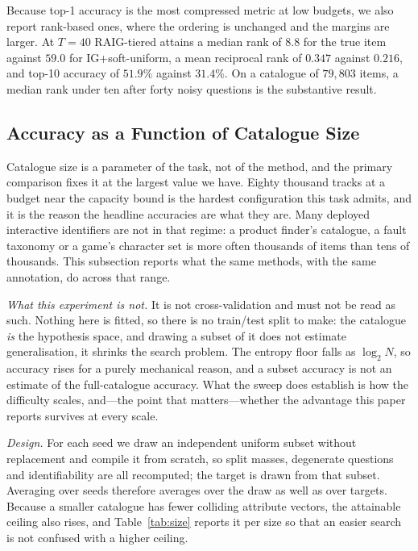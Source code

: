 Because top-1 accuracy is the most compressed metric at low budgets, we also
report rank-based ones, where the ordering is unchanged and the margins are
larger. At $T=40$ RAIG-tiered attains a median rank of $8.8$ for the true item
against $59.0$ for IG+soft-uniform, a mean reciprocal rank of $0.347$ against
$0.216$, and top-10 accuracy of $51.9\%$ against $31.4\%$. On a catalogue of
$79{,}803$ items, a median rank under ten after forty noisy questions is the
substantive result.

\subsection{Accuracy as a Function of Catalogue Size}
\label{sec:results-size}

Catalogue size is a parameter of the task, not of the method, and the primary
comparison fixes it at the largest value we have. Eighty thousand tracks at a
budget near the capacity bound is the hardest configuration this task admits,
and it is the reason the headline accuracies are what they are. Many deployed
interactive identifiers are not in that regime: a product finder's catalogue, a
fault taxonomy or a game's character set is more often thousands of items than
tens of thousands. This subsection reports what the same methods, with the same
annotation, do across that range.

\emph{What this experiment is not.} It is not cross-validation and must not be
read as such. Nothing here is fitted, so there is no train/test split to make:
the catalogue \emph{is} the hypothesis space, and drawing a subset of it does
not estimate generalisation, it shrinks the search problem. The entropy floor
falls as $\log_2 N$, so accuracy rises for a purely mechanical reason, and a
subset accuracy is not an estimate of the full-catalogue accuracy. What the
sweep does establish is how the difficulty scales, and---the point that
matters---whether the advantage this paper reports survives at every scale.

\emph{Design.} For each seed we draw an independent uniform subset without
replacement and compile it from scratch, so split masses, degenerate questions
and identifiability are all recomputed; the target is drawn from that subset.
Averaging over seeds therefore averages over the draw as well as over targets.
Because a smaller catalogue has fewer colliding attribute vectors, the
attainable ceiling also rises, and Table~\ref{tab:size} reports it per size so
that an easier search is not confused with a higher ceiling.

